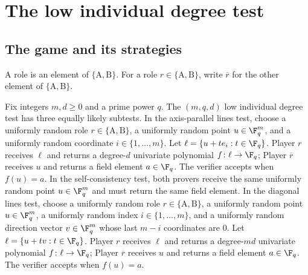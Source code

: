 \chapter{The low individual degree test}
\label{chap:test}
\label{sec:the-test}

\section{The game and its strategies}

\begin{definition}[Roles]\label{def:roles}
	\leanok
	A role is an element of $\{\mathrm A,\mathrm B\}$. For a role $r \in \{\mathrm A,\mathrm B\}$, write $\overline r$ for the other element of $\{\mathrm A,\mathrm B\}$.
\end{definition}

\begin{definition}\label{def:low-individual-degree-test}
	\leanok
	Fix integers $m,d \ge 0$ and a prime power $q$. The $(m,q,d)$ low individual degree test has three equally likely subtests.
	In the axis-parallel lines test, choose a uniformly random role $r \in \{\mathrm A,\mathrm B\}$, a uniformly random point $u \in \F_q^m$, and a uniformly random coordinate $i \in \{1,\dots,m\}$. Let $\ell=\{u+t e_i : t \in \F_q\}$. Player $r$ receives $\ell$ and returns a degree-$d$ univariate polynomial $f\colon \ell \to \F_q$; Player $\overline r$ receives $u$ and returns a field element $a \in \F_q$. The verifier accepts when $f(u)=a$.
	In the self-consistency test, both provers receive the same uniformly random point $u \in \F_q^m$ and must return the same field element.
	In the diagonal lines test, choose a uniformly random role $r \in \{\mathrm A,\mathrm B\}$, a uniformly random point $u \in \F_q^m$, a uniformly random index $i \in \{1,\dots,m\}$, and a uniformly random direction vector $v \in \F_q^m$ whose last $m-i$ coordinates are $0$. Let $\ell=\{u+t v : t \in \F_q\}$. Player $r$ receives $\ell$ and returns a degree-$md$ univariate polynomial $f\colon \ell \to \F_q$; Player $\overline r$ receives $u$ and returns a field element $a \in \F_q$. The verifier accepts when $f(u)=a$.
\end{definition}

